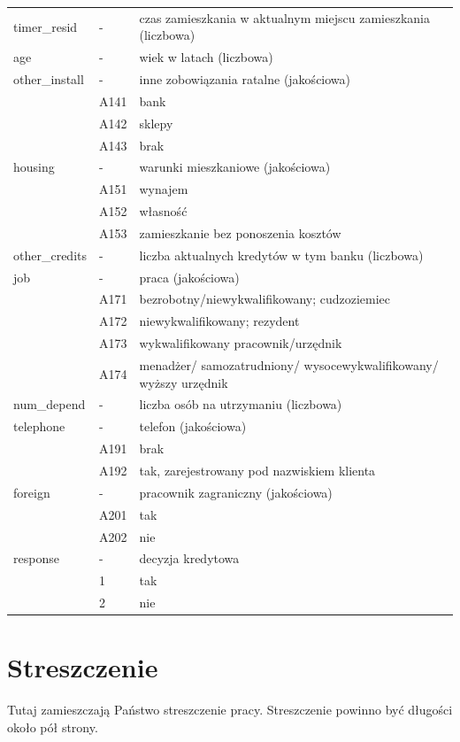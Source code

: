 \documentclass[english, twoside, 12pt, a4paper]{article}
\theoremstyle{definition}
\theoremstyle{plain}
\theoremstyle{remark}
\begin{document}
\begin{landscape}
{\begin{longtable}{lll}
timer\_resid & - & czas zamieszkania w aktualnym miejscu zamieszkania (liczbowa)\\  
age & - & wiek w latach (liczbowa)\\  
other\_install & - & inne zobowiązania ratalne (jakościowa)\\  
 & A141 & bank\\  
 & A142 & sklepy\\  
 & A143 & brak\\  
housing & - & warunki mieszkaniowe (jakościowa)\\  
 & A151 & wynajem\\  
 & A152 & własność\\  
 & A153 & zamieszkanie bez ponoszenia kosztów\\  
other\_credits & - & liczba aktualnych kredytów w tym banku (liczbowa)\\  
job & - & praca (jakościowa)\\  
 & A171 & bezrobotny/niewykwalifikowany; cudzoziemiec\\  
 & A172 & niewykwalifikowany; rezydent\\  
 & A173 & wykwalifikowany pracownik/urzędnik\\  
 & A174 & menadżer/ samozatrudniony/ wysocewykwalifikowany/ wyższy urzędnik\\  
num\_depend & - & liczba osób na utrzymaniu (liczbowa)\\  
telephone & - & telefon (jakościowa)\\  
 & A191 & brak\\  
 & A192 & tak, zarejestrowany pod nazwiskiem klienta\\  
foreign & - & pracownik zagraniczny (jakościowa)\\  
 & A201 & tak\\  
 & A202 & nie\\  
response & - & decyzja kredytowa\\  
 & 1 & tak\\  
 & 2 & nie\\ 
 \hline
\end{longtable}}
\end{landscape}



\clearpage



\clearpage
{}
\listoftables

\clearpage
{}
\listoffigures



\clearpage
{}
\section*{Streszczenie}

Tutaj zamieszczają Państwo streszczenie pracy. Streszczenie powinno być długości około pół strony.
\end{document}
